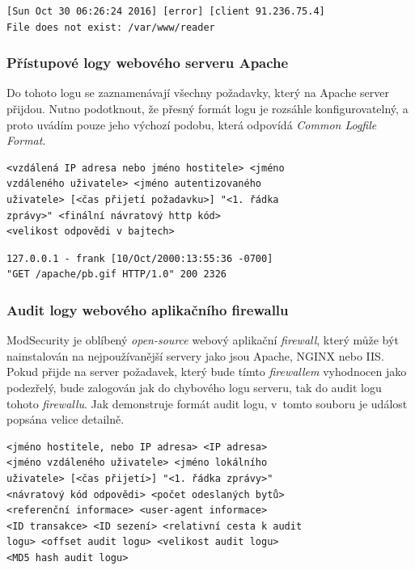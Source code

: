 \documentclass[thesis=B,czech]{FITthesis}[2012/06/26]
\begin{document}
\begin{lstlisting}[frame=single,caption=Příklad události (viz \texttt{apache-access.log}),label=exampleAPACHE_ERROR]
[Sun Oct 30 06:26:24 2016] [error] [client 91.236.75.4] 
File does not exist: /var/www/reader
\end{lstlisting}

\subsubsection{Přístupové logy webového serveru Apache}
Do tohoto logu se zaznamenávají všechny požadavky, který na Apache server přijdou. Nutno podotknout, že přesný formát logu je rozsáhle konfigurovatelný, a proto uvádím pouze jeho výchozí podobu, která odpovídá \textit{Common Logfile Format}. \cite{logFiles}

\begin{lstlisting}[frame=single,caption=Formát události z~přístupového logu serveru Apache \cite{modLogConfig},label=formatAPACHE-ACCESS]
<vzdálená IP adresa nebo jméno hostitele> <jméno 
vzdáleného uživatele> <jméno autentizovaného 
uživatele> [<čas přijetí požadavku>] "<1. řádka 
zprávy>" <finální návratový http kód> 
<velikost odpovědi v bajtech>
\end{lstlisting}

\begin{lstlisting}[frame=single,caption=Příklad události (viz \texttt{apache-access.log}),label=exampleAPACHE-ACCESS]
127.0.0.1 - frank [10/Oct/2000:13:55:36 -0700] 
"GET /apache/pb.gif HTTP/1.0" 200 2326
\end{lstlisting}

\subsubsection{Audit logy webového aplikačního firewallu}
ModSecurity je oblíbený \textit{open-source} webový aplikační \textit{firewall}, který může být nainstalován na nejpoužívanější servery jako jsou Apache, NGINX nebo IIS. 
Pokud přijde na server požadavek, který bude tímto \textit{firewallem} vyhodnocen jako podezřelý, bude zalogován jak do chybového logu serveru, tak do audit logu tohoto \textit{firewallu}. Jak demonstruje formát audit logu, v~tomto souboru je událost popsána velice detailně. 
\cite{modSecurityAnalysis}

\begin{lstlisting}[frame=single,caption=Formát události z~audit logu \cite{modSecurityDataFormats},label=formatMODSEC]
<jméno hostitele, nebo IP adresa> <IP adresa> 
<jméno vzdáleného uživatele> <jméno lokálního 
uživatele> [<čas přijetí>] "<1. řádka zprávy>" 
<návratový kód odpovědi> <počet odeslaných bytů> 
<referenční informace> <user-agent informace> 
<ID transakce> <ID sezení> <relativní cesta k audit 
logu> <offset audit logu> <velikost audit logu> 
<MD5 hash audit logu>
\end{lstlisting}
\end{document}
